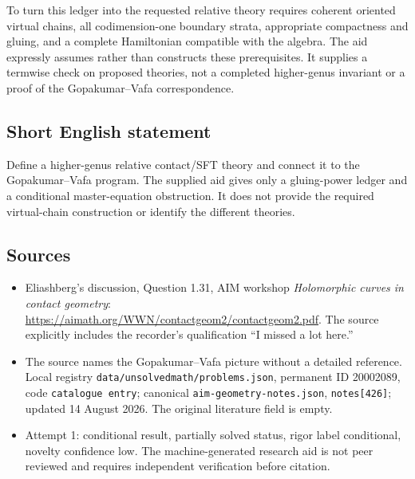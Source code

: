\documentclass[11pt]{article}
\begin{document}
To turn this ledger into the requested relative theory requires coherent oriented virtual chains, all codimension-one boundary strata, appropriate compactness and gluing, and a complete Hamiltonian compatible with the algebra. The aid expressly assumes rather than constructs these prerequisites. It supplies a termwise check on proposed theories, not a completed higher-genus invariant or a proof of the Gopakumar--Vafa correspondence.
\subsection{Short English statement}
Define a higher-genus relative contact/SFT theory and connect it to the Gopakumar--Vafa program. The supplied aid gives only a gluing-power ledger and a conditional master-equation obstruction. It does not provide the required virtual-chain construction or identify the different theories.
\subsection{Sources}
\begin{itemize}
\item Eliashberg's discussion, Question 1.31, AIM workshop \emph{Holomorphic curves in contact geometry}: \url{https://aimath.org/WWN/contactgeom2/contactgeom2.pdf}. The source explicitly includes the recorder's qualification ``I missed a lot here.''
\item The source names the Gopakumar--Vafa picture without a detailed reference. Local registry \texttt{data/unsolvedmath/problems.json}, permanent ID 20002089, code \texttt{catalogue entry}; canonical \texttt{aim-geometry-notes.json}, \texttt{notes[426]}; updated 14 August 2026. The original literature field is empty.
\item Attempt 1: conditional result, partially solved status, rigor label conditional, novelty confidence low. The machine-generated research aid is not peer reviewed and requires independent verification before citation.
\end{itemize}
\end{document}
